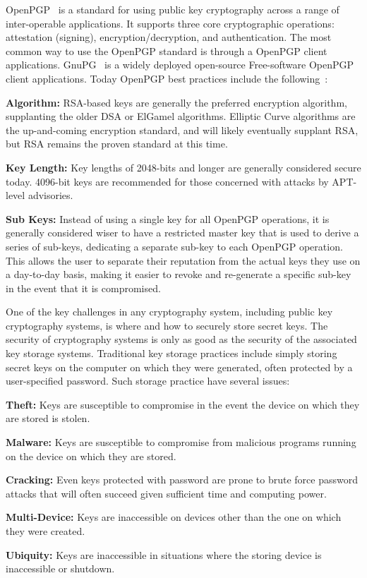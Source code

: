 \documentclass[11pt, twocolumn]{article}
\newenvironment{packed_desc}{
\begin{description}
  \setlength{\itemsep}{1pt}
  \setlength{\parskip}{0pt}
  \setlength{\parsep}{0pt}
}{\end{description}}
\begin{document}
OpenPGP~\cite{openpgp, rfc4880} is a standard for using public key
cryptography across a range of inter-operable applications. It
supports three core cryptographic operations: attestation (signing),
encryption/decryption, and authentication. The most common way to use
the OpenPGP standard is through a OpenPGP client
applications. GnuPG~\cite{gnupg} is a widely deployed open-source
Free-software OpenPGP client applications. Today OpenPGP best
practices include the following~\cite{matt-openpgp}:

\begin{packed_desc}
\item{\textbf{Algorithm:}} RSA-based keys are generally the preferred
  encryption algorithm, supplanting the older DSA or ElGamel
  algorithms. Elliptic Curve algorithms are the up-and-coming
  encryption standard, and will likely eventually supplant RSA, but
  RSA remains the proven standard at this time.
\item{\textbf{Key Length:}} Key lengths of 2048-bits and longer are
  generally considered secure today. 4096-bit keys are recommended for
  those concerned with attacks by APT-level advisories.
\item{\textbf{Sub Keys:}} Instead of using a single key for all
  OpenPGP operations, it is generally considered wiser to have a
  restricted master key that is used to derive a series of sub-keys,
  dedicating a separate sub-key to each OpenPGP operation. This allows
  the user to separate their reputation from the actual keys they use
  on a day-to-day basis, making it easier to revoke and re-generate a
  specific sub-key in the event that it is compromised.
\end{packed_desc}

One of the key challenges in any cryptography system, including public
key cryptography systems, is where and how to securely store secret
keys. The security of cryptography systems is only as good as the
security of the associated key storage systems. Traditional key
storage practices include simply storing secret keys on the computer
on which they were generated, often protected by a user-specified
password. Such storage practice have several issues:

\begin{packed_desc}
\item{\textbf{Theft:}} Keys are susceptible to compromise in the event
  the device on which they are stored is stolen.
\item{\textbf{Malware:}} Keys are susceptible to compromise from
  malicious programs running on the device on which they are stored.
\item{\textbf{Cracking:}} Even keys protected with password are prone
  to brute force password attacks that will often succeed given
  sufficient time and computing power.
\item{\textbf{Multi-Device:}} Keys are inaccessible on devices other
  than the one on which they were created.
\item{\textbf{Ubiquity:}} Keys are inaccessible in situations where
  the storing device is inaccessible or shutdown.
\end{packed_desc}
\end{document}

